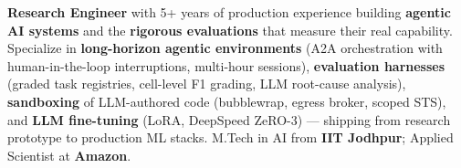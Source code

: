 \documentclass[letter,10pt]{article}
\begin{document}

\textbf{Research Engineer} with 5+ years of production experience building \textbf{agentic AI systems} and the \textbf{rigorous evaluations} that measure their real capability.
Specialize in \textbf{long-horizon agentic environments} (A2A orchestration with human-in-the-loop interruptions, multi-hour sessions), \textbf{evaluation harnesses} (graded task registries, cell-level F1 grading, LLM root-cause analysis), \textbf{sandboxing} of LLM-authored code (bubblewrap, egress broker, scoped STS), and \textbf{LLM fine-tuning} (LoRA, DeepSpeed ZeRO-3) --- shipping from research prototype to production ML stacks.
M.Tech in AI from \textbf{IIT Jodhpur}; Applied Scientist at \textbf{Amazon}.
\end{document}
